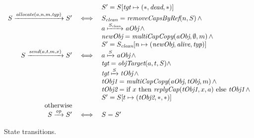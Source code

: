 \begin{figure}
\[\begin{array}{rclll}
    & & \multicolumn{3}{l}{S' = S[\ident{tgt} \mapsto (\noident{*},\NMdead,\noident{*})]} \\
    \FNsingleOp{S}{\FNcreate{a}{n}{m}{\ident{typ}}}{S'} & \iff & \multicolumn{3}{l}{S_{\ident{clean}} = \FNremoveCapsByRef{n}{S} \, \wedge} \\
    & & \multicolumn{3}{l}{\mapsTo{a}{\ident{aObj}}{S_{\ident{clean}}} \, \wedge} \\
    & & \multicolumn{3}{l}{\ident{newObj} = \FNcapTx{\ident{aObj}}{\emptyset}{m} \, \wedge} \\
    & & \multicolumn{3}{l}{S' = S_{\ident{clean}}[n \mapsto (\ident{newObj},\NMalive,\ident{typ})]} \\
    \FNsingleOp{S}{\FNsend{a}{t}{m}{x}}{S'} & \iff & \multicolumn{3}{l}{\mapsTo{a}{\ident{aObj}}{S} \, \wedge} \\
    & & \multicolumn{3}{l}{\ident{tgt} = \FNobjTarget{a}{t}{S} \wedge} \\
    & & \multicolumn{3}{l}{\mapsTo{\ident{tgt}}{\ident{tObj}}{S} \, \wedge} \\
    & & \multicolumn{3}{l}{\ident{tObj1} = \FNcapTx{\ident{aObj}}{\ident{tObj}}{m} \, \wedge} \\
    

    & & \multicolumn{3}{l}{\ident{tObj2} = \text{if } x \text{ then } \FNreplyCap{\ident{tObj1}}{x}{a} \text{ else } \ident{tObj1} \, \land} \\ 
    
    
    & & \multicolumn{3}{l}{S' = S[t \mapsto (\ident{tObj2},\noident{*},\noident{*})]} \\
    \textnormal{otherwise} & & \\
    \FNsingleOp{S}{\ident{op}}{S'} & \iff & S = S'
  \end{array}
  \]
  \caption{State transitions. \label{fig:sketch:operations}}
\end{figure}


